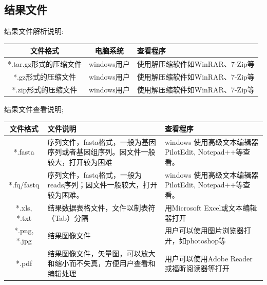 \documentclass[10pt, oneside,a4paper]{article}
\begin{document}
\subsection{结果文件}
结果文件解析说明:\par
\vspace{2 mm}
\begin{center}
\begin{tabularx}{130mm}{ccX}
\hline
\textbf{文件格式} & \textbf{电脑系统} & \textbf{查看程序} \\
\hline
*.tar.gz形式的压缩文件 & windows用户 & 使用解压缩软件如WinRAR、7-Zip等 \\
*.gz形式的压缩文件 & windows用户 & 使用解压缩软件如WinRAR、7-Zip等 \\
*.zip形式的压缩文件 & windows用户 & 使用解压缩软件如WinRAR、7-Zip等 \\
\hline
\end{tabularx}
\end{center}
\vspace{5 mm}
\par
结果文件查看说明;\par
\vspace{2 mm}
\begin{center}
\begin{tabularx}{160mm}{cXX}
\hline
\textbf{文件格式} & \textbf{文件说明} & \textbf{查看程序} \\
\hline
*.fasta & 序列文件，fasta格式，一般为基因序列或者基因组序列。因文件一般较大，打开较为困难 & windows 使用高级文本编辑器 PilotEdit, Notepad++等查看。 \\
*.fq/fastq & 序列文件，fastq格式，一般为reads序列；因文件一般较大，打开较为困难。 & windows 使用高级文本编辑器 PilotEdit, Notepad++等查看。 \\
*.xls, *.txt & 结果数据表格文件，文件以制表符（Tab）分隔 & 用Microsoft Excel或文本编辑器打开 \\
*.png, *.jpg & 结果图像文件 & 用户可以使用图片浏览器打开，如photoshop等 \\
*.pdf & 结果图像文件，矢量图，可以放大和缩小而不失真，方便用户查看和编辑处理 & 用户可以使用Adobe Reader或福昕阅读器等打开 \\
\hline
\end{tabularx}
\end{center}


\newpage
\end{document}
